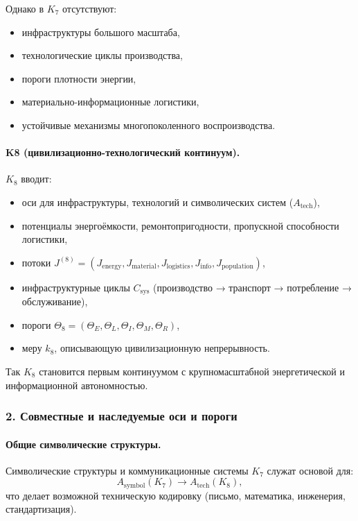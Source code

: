 Однако в $K_7$ отсутствуют:
\begin{itemize}
  \item инфраструктуры большого масштаба,
  \item технологические циклы производства,
  \item пороги плотности энергии,
  \item материально-информационные логистики,
  \item устойчивые механизмы многопоколенного воспроизводства.
\end{itemize}

\paragraph{K8 (цивилизационно-технологический континуум).}
$K_8$ вводит:
\begin{itemize}
  \item оси для инфраструктуры, технологий и символических систем
        ($A_{\mathrm{tech}}$),
  \item потенциалы энергоёмкости, ремонтопригодности, пропускной
        способности логистики,
  \item потоки $J^{(8)} = (J_{\mathrm{energy}}, J_{\mathrm{material}},
        J_{\mathrm{logistics}}, J_{\mathrm{info}}, J_{\mathrm{population}})$,
  \item инфраструктурные циклы $C_{\mathrm{sys}}$
        (производство → транспорт → потребление → обслуживание),
  \item пороги $\Theta_8 = (\Theta_E, \Theta_L, \Theta_I, \Theta_M, \Theta_R)$,
  \item меру $k_8$, описывающую цивилизационную непрерывность.
\end{itemize}

Так $K_8$ становится первым континуумом с крупномасштабной энергетической
и информационной автономностью.

\subsubsection{2. Совместные и наследуемые оси и пороги}

\paragraph{Общие символические структуры.}
Символические структуры и коммуникационные системы $K_7$ служат основой для:
\[
A_{\mathrm{symbol}}(K_7) \rightarrow A_{\mathrm{tech}}(K_8),
\]
что делает возможной техническую кодировку (письмо, математика, инженерия,
стандартизация).

